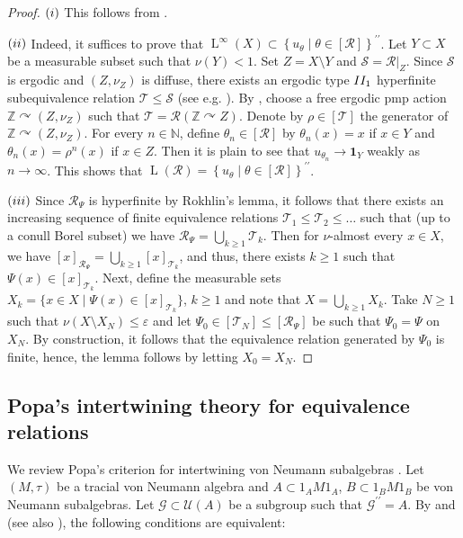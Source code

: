 \documentclass[11pt]{amsart}
\numberwithin{equation}{section}
\theoremstyle{plain}
\theoremstyle{definition}
\newcommand{\N}{\mathbb{N}}
\newcommand{\Z}{\mathbb{Z}}
\newcommand{\dpr}{^{\prime\prime}}
\newcommand{\rL}{\operatorname{L}}
\begin{document}
\begin{proof}
$(\rm i)$ This follows from \cite[Theorem 11.20]{LM24}.

$(\rm ii)$ Indeed, it suffices to prove that $\rL^\infty(X) \subset \left\{u_\theta \mid \theta \in [\mathscr R] \right\}\dpr$. Let $Y \subset X$ be a measurable subset such that $\nu(Y) < 1$. Set $Z = X \setminus Y$ and $\mathscr S = \mathscr R|_Z$. Since $\mathscr S$ is ergodic and $(Z, \nu_Z)$ is diffuse, there exists an ergodic type ${\rm II_1}$ hyperfinite subequivalence relation $\mathscr T \leq \mathscr S$ (see e.g.\! \cite[Proposition 9.3.2]{Zi84}). By \cite{CFW81},  choose a free ergodic pmp action $\Z \curvearrowright (Z, \nu_Z)$ such that $\mathscr T = \mathscr R(\Z \curvearrowright Z)$. Denote by $\rho \in [\mathscr T]$ the generator of $\Z \curvearrowright (Z, \nu_Z)$. For every $n \in \N$, define $\theta_n \in [\mathscr R]$ by $\theta_n(x) = x$ if $x \in Y$ and $\theta_n(x) = \rho^n(x)$ if $x \in Z$. Then it is plain to see that $u_{\theta_n} \to \mathbf 1_Y$ weakly as $n \to \infty$. This shows that $\rL(\mathscr R) = \left\{u_\theta \mid \theta \in [\mathscr R] \right\}\dpr$.

$(\rm iii)$ Since $\mathscr R_\Psi$ is hyperfinite by Rokhlin's lemma, it follows that there exists an increasing sequence of finite equivalence relations $\mathscr T_1\leq \mathscr T_2\leq \dots$ such that  (up to a conull Borel subset) we have $\mathscr R_{\Psi}= \bigcup_{k\geq 1} \mathscr T_k$. Then for $\nu$-almost every $x\in X$, we have $[x]_{\mathscr R_\Psi}=\bigcup_{k\ge 1}[x]_{\mathscr T_k}$, and thus, there exists $k\ge 1$ such that $\Psi(x)\in [x]_{\mathscr T_k}$. Next, define the measurable sets $X_k=\{ x\in X \mid \Psi(x) \in [x]_{\mathscr T_k}  \}$, $k\ge 1$ and note that $X=\bigcup_{k\ge 1} X_k$. Take $N\ge 1$ such that $\nu(X\setminus X_N)\leq \varepsilon$ and let $\Psi_0\in [\mathscr T_N]\leq [\mathscr R_{\Psi}]$ be such that $\Psi_0=\Psi$ on $X_N$. By construction, it follows that the equivalence relation generated by $\Psi_0$ is finite, hence, the lemma follows by letting $X_0=X_N$. 
\end{proof}





\subsection{Popa's intertwining theory for equivalence relations}

We review Popa's criterion for intertwining von Neumann subalgebras \cite{Po01, Po03}. Let $(M, \tau)$ be a tracial von Neumann algebra and $A\subset 1_A M 1_A$, $B \subset 1_B M 1_B$ be von Neumann subalgebras. Let $\mathcal G\subset \mathscr U(A)$ be a subgroup such that $\mathscr G\dpr=A.$ By \cite[Corollary 2.3]{Po03} and \cite[Theorem A.1]{Po01} (see also \cite[Proposition C.1]{Va06}), the following conditions are equivalent:
\end{document}
